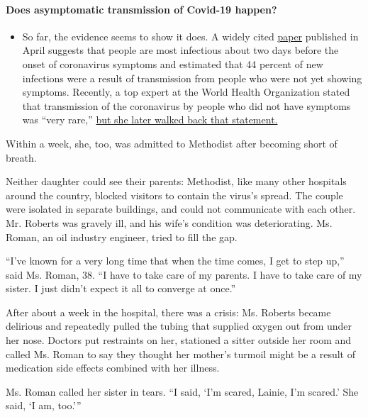 \begin{itemize}
{  \paragraph{Does asymptomatic transmission of Covid-19
  happen?}\label{does-asymptomatic-transmission-of-covid-19-happen}}

  \begin{itemize}
  \tightlist
  \item
    So far, the evidence seems to show it does. A widely cited
    \href{https://www.nature.com/articles/s41591-020-0869-5}{paper}
    published in April suggests that people are most infectious about
    two days before the onset of coronavirus symptoms and estimated that
    44 percent of new infections were a result of transmission from
    people who were not yet showing symptoms. Recently, a top expert at
    the World Health Organization stated that transmission of the
    coronavirus by people who did not have symptoms was ``very rare,''
    \href{https://www.nytimes.com/2020/06/09/world/coronavirus-updates.html?action=click\&pgtype=Article\&state=default\&region=MAIN_CONTENT_3\&context=storylines_faq\#link-1f302e21}{but
    she later walked back that statement.}
  \end{itemize}
\end{itemize}

Within a week, she, too, was admitted to Methodist after becoming short
of breath.

Neither daughter could see their parents: Methodist, like many other
hospitals around the country, blocked visitors to contain the virus's
spread. The couple were isolated in separate buildings, and could not
communicate with each other. Mr. Roberts was gravely ill, and his wife's
condition was deteriorating. Ms. Roman, an oil industry engineer, tried
to fill the gap.

``I've known for a very long time that when the time comes, I get to
step up,'' said Ms. Roman, 38. ``I have to take care of my parents. I
have to take care of my sister. I just didn't expect it all to converge
at once.''

After about a week in the hospital, there was a crisis: Ms. Roberts
became delirious and repeatedly pulled the tubing that supplied oxygen
out from under her nose. Doctors put restraints on her, stationed a
sitter outside her room and called Ms. Roman to say they thought her
mother's turmoil might be a result of medication side effects combined
with her illness.

Ms. Roman called her sister in tears. ``I said, `I'm scared, Lainie, I'm
scared.' She said, `I am, too.'''

